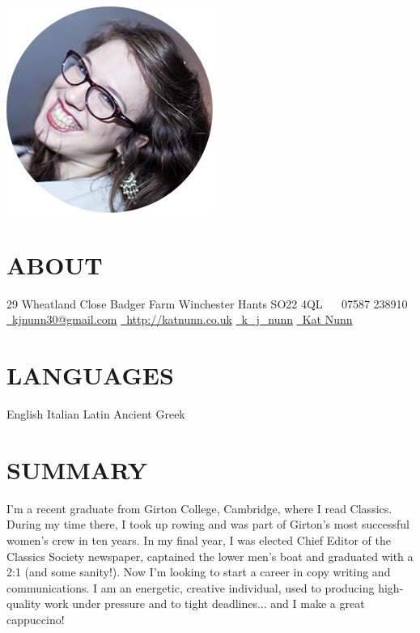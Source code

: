 \documentclass[]{friggeri-cv}
\begin{document}
       {}

\begin{aside}
  \includegraphics[width=.66\textwidth]{../img/profile.png}
  \section{ABOUT}
    29 Wheatland Close
    Badger Farm
    Winchester
    Hants
    SO22 4QL
    ~
    \faPhone~07587 238910
    \href{mailto:kjnunn30@gmail.com}{\faEnvelope~kjnunn30@gmail.com}
    \href{http://katnunn.co.uk}{\faGlobe~http://katnunn.co.uk}
    \href{https://twitter.com/k\_j\_nunn}{\faTwitter~k\_j\_nunn}
    \href{http://uk.linkedin.com/in/katnunn/}{\faLinkedin~Kat Nunn}
  \section{LANGUAGES}
    English
    Italian
    Latin
    Ancient Greek
\end{aside}

\section{SUMMARY}

I'm a recent graduate from Girton College, Cambridge, where I read Classics. During my time there, I took up rowing and was part of Girton's most successful women's crew in ten years. In my final year, I was elected Chief Editor of the Classics Society newspaper, captained the lower men's boat and graduated with a 2:1 (and some sanity!). Now I'm looking to start a career in copy writing and communications. I am an energetic, creative individual, used to producing high-quality work under pressure and to tight deadlines... and I make a great cappuccino!
\end{document}
